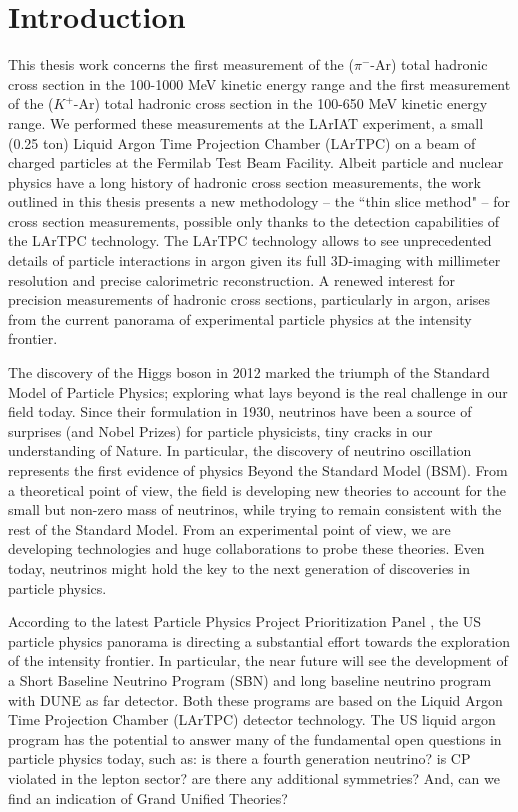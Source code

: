 \chapter*{Introduction}\label{ch:-1}

This thesis work concerns the first measurement of the  ($\pi^-$-Ar)  total hadronic cross section  in the 100-1000 MeV  kinetic energy range and the first measurement of the ($K^+$-Ar) total hadronic cross section  in the 100-650 MeV  kinetic energy range. We performed these measurements at the LArIAT experiment,  a small (0.25 ton)  Liquid Argon Time Projection Chamber (LArTPC) on a beam of charged particles at the Fermilab Test Beam Facility.  Albeit particle and nuclear physics have a long history of hadronic cross section measurements, the work outlined in this thesis presents a new methodology -- the ``thin slice method" -- for cross section measurements, possible only thanks to the detection capabilities of the LArTPC technology. The LArTPC technology allows to see unprecedented details of particle interactions in argon given its full 3D-imaging with millimeter resolution and precise calorimetric reconstruction. A renewed interest for precision measurements of hadronic cross sections, particularly in argon, arises from the current  panorama of experimental  particle physics at the intensity frontier.

The discovery of the Higgs boson in 2012 marked the triumph of the Standard Model of Particle Physics; exploring what lays beyond is the real challenge in our field today. 
Since their formulation in 1930, neutrinos have been a source of surprises (and Nobel Prizes) for particle physicists, tiny cracks in our understanding of Nature. In particular, the discovery of neutrino oscillation represents the first evidence of physics Beyond the Standard Model (BSM).  From a theoretical point of view, the field is developing new theories to account for the small but non-zero mass of neutrinos, while trying to remain consistent with the rest of the Standard Model.  From an experimental point of view, we are developing technologies and huge collaborations to probe these theories. Even today, neutrinos might hold the key to the next generation of discoveries in particle physics.

According to the latest Particle Physics Project Prioritization Panel  \cite{P5}, the US particle physics panorama is directing a substantial effort towards the exploration of the intensity frontier. In particular, the near future will see the development of a Short Baseline Neutrino Program (SBN) and long baseline neutrino program with  DUNE as far detector. Both these programs are based on the Liquid Argon Time Projection Chamber (LArTPC) detector technology. The US liquid argon program has the potential to answer many of the fundamental open questions in particle physics today, such as: is there a fourth generation neutrino? is CP violated in the lepton sector? are there any additional symmetries? And, can we find an indication of Grand Unified Theories? 

